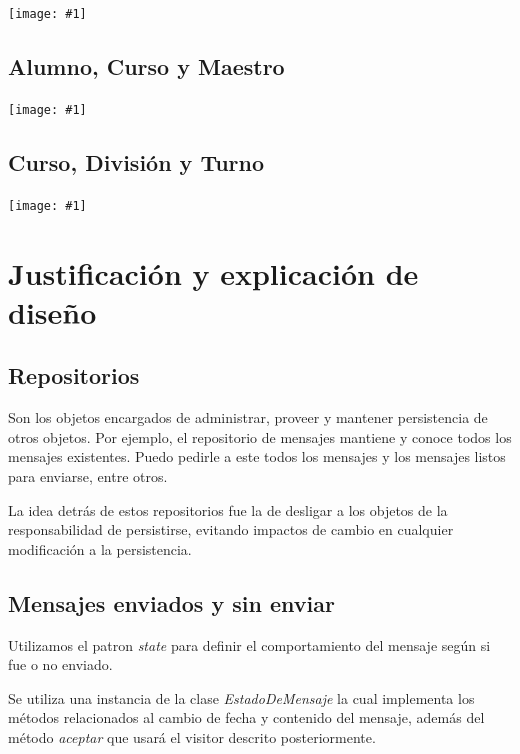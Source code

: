 \documentclass[a4paper, 10pt, twoside]{article}
\newcommand{\grafico}[1]{
  \begin{center}
    \texttt{[image: \#1]}
  \end{center}
}
\begin{document}
\grafico{diagramas/emisorDeMensajes.pdf}


\subsection{Alumno, Curso y Maestro}

\grafico{diagramas/alumnoCursoMaestro.pdf}


\subsection{Curso, División y Turno}

\grafico{diagramas/cursoDivisionTurno.pdf}

\newpage


\section{Justificación y explicación de diseño}

\subsection{Repositorios}
Son los objetos encargados de administrar, proveer y mantener persistencia de otros objetos. Por ejemplo,
el repositorio de mensajes mantiene y conoce todos los mensajes existentes. Puedo pedirle a este todos
los mensajes y  los mensajes listos para enviarse, entre otros.

La idea detrás de estos repositorios fue la de desligar a los objetos de la responsabilidad de persistirse,
evitando impactos de cambio en cualquier modificación a la persistencia.

\subsection{Mensajes enviados y sin enviar}
Utilizamos el patron \textit{state} para definir el comportamiento del mensaje según si fue o no enviado.

Se utiliza una instancia de la clase \textit{EstadoDeMensaje} la cual implementa los métodos relacionados al 
cambio de fecha y contenido del mensaje, además del método \textit{aceptar} que usará el visitor descrito 
posteriormente.
\end{document}
